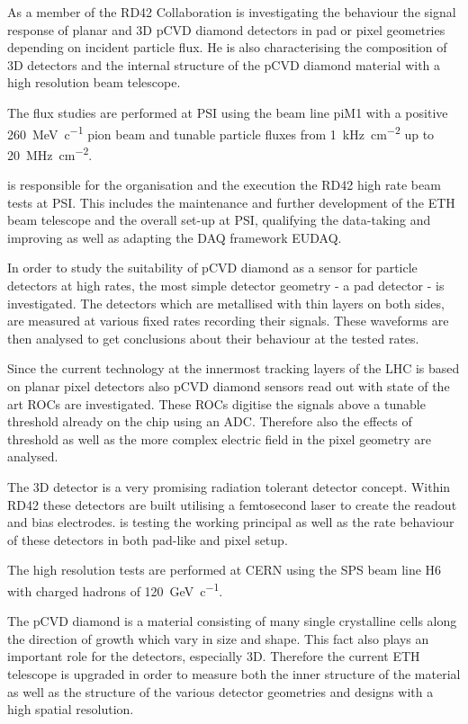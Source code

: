 
As a member of the RD42 Collaboration \me is investigating the behaviour the signal response of planar and 3D \ac{pCVD} diamond detectors in pad or pixel geometries depending on incident particle flux. He is also characterising the composition of 3D detectors and the internal structure of the \ac{pCVD} diamond material with a high resolution beam telescope.\parsmall

The flux studies are performed at \ac{PSI} using the beam line piM1 with a positive \SI{260}{\mega\electronvolt\per c} pion beam and tunable particle fluxes from \SI{1}{\kilo\hertz\per\centi\meter^2} up to \SI{20}{\mega\hertz\per\centi\meter^2}.\par
\me is responsible for the organisation and the execution the RD42 high rate beam tests at \ac{PSI}. This includes the maintenance and further development of the ETH beam telescope and the overall set-up at \ac{PSI}, qualifying the data-taking and improving as well as adapting the \ac{DAQ} framework EUDAQ.\par

In order to study the suitability of \ac{pCVD} diamond as a sensor for particle detectors at high rates, the most simple detector geometry - a pad detector - is investigated. The detectors which are metallised with thin layers on both sides, are measured at various fixed rates recording their signals. These waveforms are then analysed to get conclusions about their behaviour at the tested rates.\par

Since the current technology at the innermost tracking layers of the LHC is based on planar pixel detectors also \ac{pCVD} diamond sensors read out with state of the art \acp{ROC} are investigated. These \acp{ROC} digitise the signals above a tunable threshold already on the chip using an \ac{ADC}. Therefore also the effects of threshold as well as the more complex electric field in the pixel geometry are analysed.\par

The 3D detector is a very promising radiation tolerant detector concept. Within RD42 these detectors are built utilising a femtosecond laser to create the readout and bias electrodes. \me is testing the working principal as well as the rate behaviour of these detectors in both pad-like and pixel setup.\parsmall

The high resolution tests are performed at CERN using the SPS beam line H6 with charged hadrons of \SI{120}{\giga\electronvolt\per c}.\par
The \ac{pCVD} diamond is a material consisting of many single crystalline cells along the direction of growth which vary in size and shape. This fact also plays an important role for the detectors, especially 3D. Therefore the current ETH telescope is upgraded in order to measure both the inner structure of the material as well as the structure of the various detector geometries and designs with a high spatial resolution.\parend